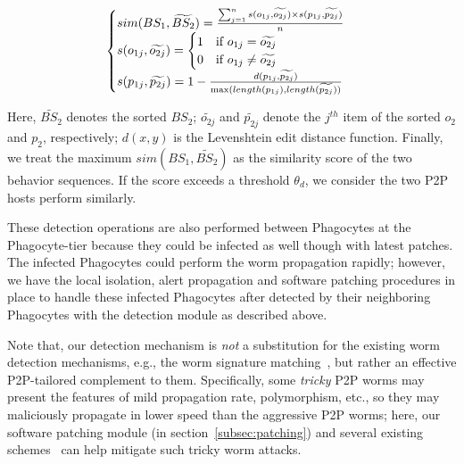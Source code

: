 \documentclass[times,10pt,twocolumn]{article}
\begin{document}
\begin{equation} \label{eqn:sim}
    \begin{aligned}
    \begin{cases}
        sim(BS_1, \widetilde{BS_2}) = \frac{\sum_{j=1}^n s(o_{1j}, \widetilde{o_{2j}}) \times s(p_{1j}, \widetilde{p_{2j}})}{n} \\
        s(o_{1j}, \widetilde{o_{2j}}) =
            \begin{cases}
            1 \textrm{\quad if $o_{1j} = \widetilde{o_{2j}}$} \\
            0 \textrm{\quad if $o_{1j} \neq \widetilde{o_{2j}}$}
            \end{cases} \\
        s(p_{1j}, \widetilde{p_{2j}}) = 1 - \frac{d(p_{1j}, \widetilde{p_{2j}})}{\max(length(p_{1j}), length(\widetilde{p_{2j}}))}
    \end{cases}
    \end{aligned}
\end{equation}


\noindent Here, $\widetilde{BS_2}$ denotes the sorted $BS_2$;
$\widetilde{o_{2j}}$ and $\widetilde{p_{2j}}$ denote the $j^{th}$
item of the sorted $o_2$ and ${p_2}$, respectively; $d(x, y)$ is the
Levenshtein edit distance function. Finally, we treat the maximum
$sim(BS_1, \widetilde{BS_2})$ as the similarity score of the two
behavior sequences. If the score exceeds a threshold $\theta_d$, we
consider the two P2P hosts perform similarly.



These detection operations are also performed between Phagocytes at
the Phagocyte-tier because they could be infected as well though
with latest patches. The infected Phagocytes could perform the worm
propagation rapidly; however, we have the local isolation, alert
propagation and software patching procedures in place to handle
these infected Phagocytes after detected by their neighboring
Phagocytes with the detection module as described above.




Note that, our detection mechanism is \emph{not} a substitution for
the existing worm detection mechanisms, e.g., the worm signature
matching~\cite{BrumleyNSWJ06}, but rather an effective P2P-tailored
complement to them. Specifically, some \emph{tricky} P2P worms may
present the features of mild propagation rate, polymorphism, etc.,
so they may maliciously propagate in lower speed than the aggressive
P2P worms; here, our software patching module (in
section~\ref{subsec:patching}) and several existing
schemes~\cite{1095824,WangGSZ04} can help mitigate such tricky worm
attacks.
\end{document}
